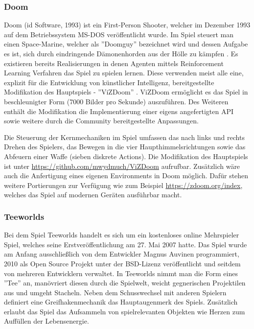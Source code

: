 \documentclass[11pt]{scrartcl}
\begin{document}
\subsubsection{Doom}
Doom (id Software, 1993) ist ein First-Person Shooter, welcher im Dezember 1993 auf dem Betriebssystem
MS-DOS veröffentlicht wurde. Im Spiel steuert man einen Space-Marine, welcher als ''Doomguy'' bezeichnet
wird und dessen Aufgabe es ist, sich durch eindringende Dämonenhorden aus der Hölle zu kämpfen
\cite{D1993}. Es existieren bereits Realisierungen in denen Agenten mittels Reinforcement Learning
Verfahren das Spiel zu spielen lernen. Diese verwenden meist alle eine, explizit für die Entwicklung
von künstlicher Intelligenz, bereitgestellte Modifikation des Hauptspiels - ''ViZDoom'' \cite{ViZDoom}. 
ViZDoom ermöglicht es das Spiel in beschleunigter Form (7000 Bilder pro Sekunde) auszuführen. Des
Weiteren enthält die Modifikation die Implementierung einer eigens angefertigten API sowie weitere
durch die Community bereitgestellte Anpassungen.

Die Steuerung der Kernmechaniken im Spiel umfassen das nach links und rechts Drehen des Spielers,
das Bewegen in die vier Haupthimmelsrichtungen sowie das Abfeuern einer Waffe (sieben diskrete
Actions). Die Modifikation des Hauptspiels ist unter \url{https://github.com/mwydmuch/ViZDoom}
aufrufbar. Zusätzlich wäre auch die Anfertigung eines eigenen Environments in Doom möglich. Dafür
stehen weitere Portierungen zur Verfügung wie zum Beispiel \url{https://zdoom.org/index}, welches
das Spiel auf modernen Geräten ausführbar macht. 

\newpage
\subsubsection{Teeworlds}
Bei dem Spiel Teeworlds handelt es sich um ein kostenloses online Mehrspieler Spiel, welches seine
Erstveröffentlichung am 27. Mai 2007 hatte. Das Spiel wurde am Anfang ausschließlich von dem
Entwickler Magnus Auvinen programmiert, 2010 als Open Source Projekt unter der BSD-Lizenz
veröffentlicht und seitdem von mehreren Entwicklern verwaltet. In Teeworlds nimmt man die Form
eines ''Tee'' an, manövriert diesen durch die Spielwelt, weicht gegnerischen Projektilen aus und
umgeht Stacheln. Neben dem Schusswechsel mit anderen Spielern definiert eine Greifhakenmechanik das
Hauptaugenmerk des Spiels. Zusätzlich erlaubt das Spiel das Aufsammeln von spielrelevanten Objekten
wie Herzen zum Auffüllen der Lebensenergie.
\end{document}
